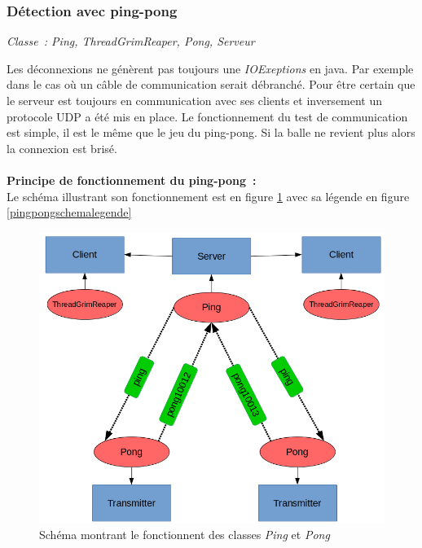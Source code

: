 \documentclass[a4paper,11pt]{report}
\begin{document}
    \subsubsection{Détection avec ping-pong}
    \begin{center}
    \textit{Classe : Ping, ThreadGrimReaper, Pong, Serveur}
    \end{center}
      Les déconnexions ne génèrent pas toujours une \textit{IOExeptions} en java. Par exemple dans le cas où un câble de communication serait débranché. Pour être certain que le serveur est toujours en communication avec ses clients et inversement un protocole UDP a été mis en place. Le fonctionnement du test de communication est simple, il est le même que le jeu du ping-pong. Si la balle ne revient plus alors la connexion est brisé.
\\
\\
\textbf{Principe de fonctionnement du ping-pong :}
\\
Le schéma illustrant son fonctionnement est en figure \ref{pingpongschema} avec sa légende en figure \ref{pingpongschemalegende}
\begin{figure}[th]
      \begin{center}
        \includegraphics[scale=0.5]{Assets/s_r_3.png}
        \caption{Schéma montrant le fonctionnent des classes \textit{Ping} et \textit{Pong}}
        \label{pingpongschema}
      \end{center}
\end{figure}
\end{document}
